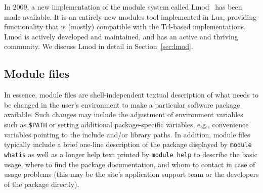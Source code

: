 In 2009, a new implementation of the module system called
Lmod~\cite{taccLmod} has
been made available. It is an entirely new modules tool implemented in
Lua, providing functionality that is (mostly) compatible with the Tcl-based
implementations.  Lmod is actively developed and maintained, and has
an active and thriving community. We discuss Lmod in detail in
Section~\ref{sec:lmod}.


%
%

\subsection{Module files}
\label{sec:Module_files}

In essence, module files are shell-independent textual description of
what needs to be changed in the user's environment to make a
particular software package available. Such changes may include the
adjustment of environment variables such as \texttt{\$PATH} or setting
additional package-specific variables, e.g., convenience
variables pointing to the include and/or library paths.  In addition,
module files typically include a brief one-line description of the
package displayed by \texttt{module whatis} as well as a longer help
text printed by \texttt{module help} to describe the basic usage,
where to find the package documentation, and whom to contact in case
of usage problems (this may be the site's application support team or
the developers of the package directly).

